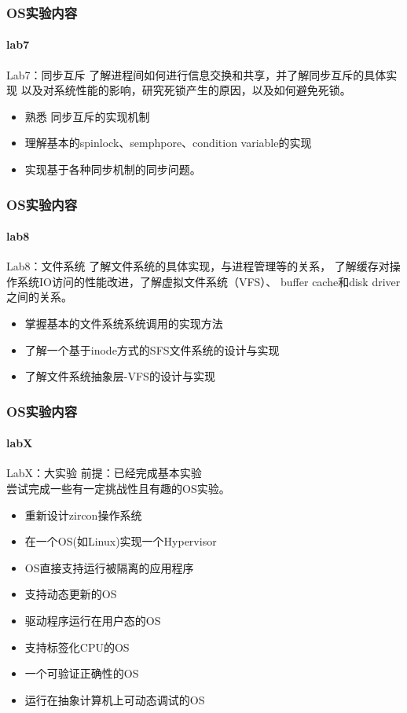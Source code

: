 \begin{frame}
\frametitle{OS实验内容}
\framesubtitle{lab7}

\begin{block}{Lab7：同步互斥}
了解进程间如何进行信息交换和共享，并了解同步互斥的具体实现
以及对系统性能的影响，研究死锁产生的原因，以及如何避免死锁。
\end{block}

\begin{itemize}
    \item 熟悉 同步互斥的实现机制
    \item 理解基本的spinlock、semphpore、condition variable的实现
    \item 实现基于各种同步机制的同步问题。
\end{itemize}

\end{frame}


\begin{frame}
\frametitle{OS实验内容}
\framesubtitle{lab8}

\begin{block}{Lab8：文件系统}
了解文件系统的具体实现，与进程管理等的关系，
了解缓存对操作系统IO访问的性能改进，了解虚拟文件系统（VFS）、
buffer cache和disk driver之间的关系。
\end{block}

\begin{itemize}
    \item 掌握基本的文件系统系统调用的实现方法
    \item 了解一个基于inode方式的SFS文件系统的设计与实现
    \item 了解文件系统抽象层-VFS的设计与实现
\end{itemize}

\end{frame}


\begin{frame}
\frametitle{OS实验内容}
\framesubtitle{labX}

\begin{block}{LabX：大实验}
前提：已经完成基本实验 \\
尝试完成一些有一定挑战性且有趣的OS实验。
\end{block}

\begin{itemize}
    \item 重新设计zircon操作系统
    \item 在一个OS(如Linux)实现一个Hypervisor
    \item OS直接支持运行被隔离的应用程序
    \item 支持动态更新的OS
    \item 驱动程序运行在用户态的OS
    \item 支持标签化CPU的OS
    \item 一个可验证正确性的OS
    \item 运行在抽象计算机上可动态调试的OS
\end{itemize}

\end{frame}


